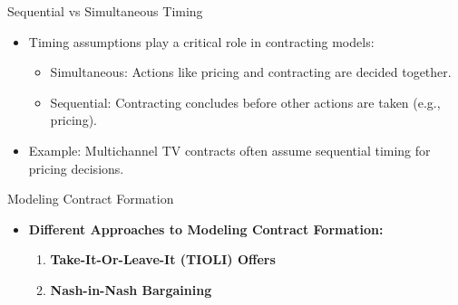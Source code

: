 \documentclass[aspectratio=169]{beamer}  %
\begin{document}
\begin{frame}{Sequential vs Simultaneous Timing}
    \begin{itemize}
        \item Timing assumptions play a critical role in contracting models:
        \begin{itemize}
            \item Simultaneous: Actions like pricing and contracting are decided together.
            \item Sequential: Contracting concludes before other actions are taken (e.g., pricing).
        \end{itemize}
        \item Example: Multichannel TV contracts often assume sequential timing for pricing decisions.
    \end{itemize}
\end{frame}



\begin{frame}{Modeling Contract Formation}
\begin{itemize}
    \item \textbf{Different Approaches to Modeling Contract Formation:}
    \begin{enumerate}
        \item \textbf{Take-It-Or-Leave-It (TIOLI) Offers}
        
        \item \textbf{Nash-in-Nash Bargaining}
    \end{enumerate}
    \end{itemize}
\end{frame}
\end{document}
